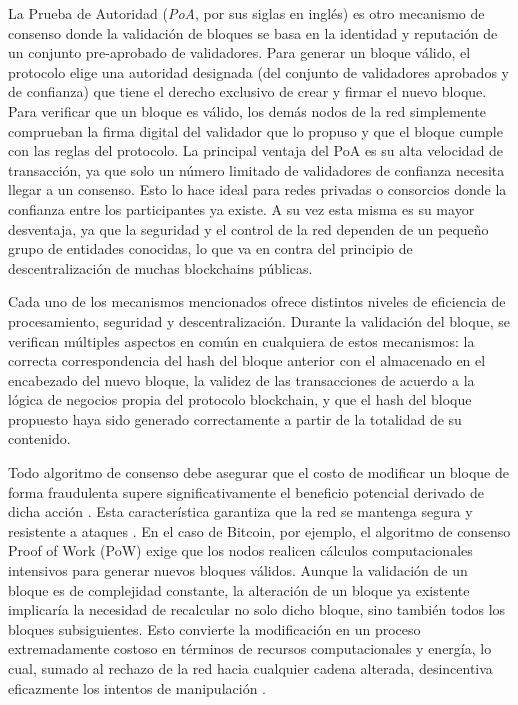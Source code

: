 La Prueba de Autoridad (\textit{PoA}, por sus siglas en inglés) es otro mecanismo de consenso donde la validación de bloques se basa en la identidad y reputación de un conjunto pre-aprobado de validadores. Para generar un bloque válido, el protocolo elige una autoridad designada (del conjunto de validadores aprobados y de confianza) que tiene el derecho exclusivo de crear y firmar el nuevo bloque. Para verificar que un bloque es válido, los demás nodos de la red simplemente comprueban la firma digital del validador que lo propuso y que el bloque cumple con las reglas del protocolo. La principal ventaja del PoA es su alta velocidad de transacción, ya que solo un número limitado de validadores de confianza necesita llegar a un consenso. Esto lo hace ideal para redes privadas o consorcios donde la confianza entre los participantes ya existe. A su vez esta misma es su mayor desventaja, ya que la seguridad y el control de la red dependen de un pequeño grupo de entidades conocidas, lo que va en contra del principio de descentralización de muchas blockchains públicas.

Cada uno de los mecanismos mencionados ofrece distintos niveles de eficiencia de procesamiento, seguridad y descentralización. Durante la validación del bloque, se verifican múltiples aspectos en común en cualquiera de estos mecanismos: la correcta correspondencia del hash del bloque anterior con el almacenado en el encabezado del nuevo bloque, la validez de las transacciones de acuerdo a la lógica de negocios propia del protocolo blockchain, y que el hash del bloque propuesto haya sido generado correctamente a partir de la totalidad de su contenido.

Todo algoritmo de consenso debe asegurar que el costo de modificar un bloque de forma fraudulenta supere significativamente el beneficio potencial derivado de dicha acción \cite{satoshi2008bitcoin}. Esta característica garantiza que la red se mantenga segura y resistente a ataques \cite{buterin2013ethereum}. En el caso de Bitcoin, por ejemplo, el algoritmo de consenso Proof of Work (PoW) exige que los nodos realicen cálculos computacionales intensivos para generar nuevos bloques válidos. Aunque la validación de un bloque es de complejidad constante, la alteración de un bloque ya existente implicaría la necesidad de recalcular no solo dicho bloque, sino también todos los bloques subsiguientes. Esto convierte la modificación en un proceso extremadamente costoso en términos de recursos computacionales y energía, lo cual, sumado al rechazo de la red hacia cualquier cadena alterada, desincentiva eficazmente los intentos de manipulación \cite{satoshi2008bitcoin}.

